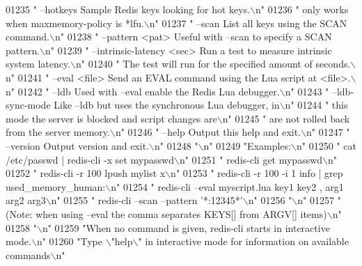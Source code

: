 \begin{DoxyCode}
{{{{{{{{{{{{{{{{{{{{{{{{{{{{{{{{{{01235 \textcolor{stringliteral}{"  --hotkeys          Sample Redis keys looking for hot keys.\(\backslash\)n"}
01236 \textcolor{stringliteral}{"                     only works when maxmemory-policy is *lfu.\(\backslash\)n"}
01237 \textcolor{stringliteral}{"  --scan             List all keys using the SCAN command.\(\backslash\)n"}
01238 \textcolor{stringliteral}{"  --pattern <pat>    Useful with --scan to specify a SCAN pattern.\(\backslash\)n"}
01239 \textcolor{stringliteral}{"  --intrinsic-latency <sec> Run a test to measure intrinsic system latency.\(\backslash\)n"}
01240 \textcolor{stringliteral}{"                     The test will run for the specified amount of seconds.\(\backslash\)n"}
01241 \textcolor{stringliteral}{"  --eval <file>      Send an EVAL command using the Lua script at <file>.\(\backslash\)n"}
01242 \textcolor{stringliteral}{"  --ldb              Used with --eval enable the Redis Lua debugger.\(\backslash\)n"}
01243 \textcolor{stringliteral}{"  --ldb-sync-mode    Like --ldb but uses the synchronous Lua debugger, in\(\backslash\)n"}
01244 \textcolor{stringliteral}{"                     this mode the server is blocked and script changes are\(\backslash\)n"}
01245 \textcolor{stringliteral}{"                     are not rolled back from the server memory.\(\backslash\)n"}
01246 \textcolor{stringliteral}{"  --help             Output this help and exit.\(\backslash\)n"}
01247 \textcolor{stringliteral}{"  --version          Output version and exit.\(\backslash\)n"}
01248 \textcolor{stringliteral}{"\(\backslash\)n"}
01249 \textcolor{stringliteral}{"Examples:\(\backslash\)n"}
01250 \textcolor{stringliteral}{"  cat /etc/passwd | redis-cli -x set mypasswd\(\backslash\)n"}
01251 \textcolor{stringliteral}{"  redis-cli get mypasswd\(\backslash\)n"}
01252 \textcolor{stringliteral}{"  redis-cli -r 100 lpush mylist x\(\backslash\)n"}
01253 \textcolor{stringliteral}{"  redis-cli -r 100 -i 1 info | grep used\_memory\_human:\(\backslash\)n"}
01254 \textcolor{stringliteral}{"  redis-cli --eval myscript.lua key1 key2 , arg1 arg2 arg3\(\backslash\)n"}
01255 \textcolor{stringliteral}{"  redis-cli --scan --pattern '*:12345*'\(\backslash\)n"}
01256 \textcolor{stringliteral}{"\(\backslash\)n"}
01257 \textcolor{stringliteral}{"  (Note: when using --eval the comma separates KEYS[] from ARGV[] items)\(\backslash\)n"}
01258 \textcolor{stringliteral}{"\(\backslash\)n"}
01259 \textcolor{stringliteral}{"When no command is given, redis-cli starts in interactive mode.\(\backslash\)n"}
01260 \textcolor{stringliteral}{"Type \(\backslash\)"help\(\backslash\)" in interactive mode for information on available commands\(\backslash\)n"}
}}}}}}}}}}}}}}}}}}}}}}}}}}}}}}}}}}
\end{DoxyCode}

